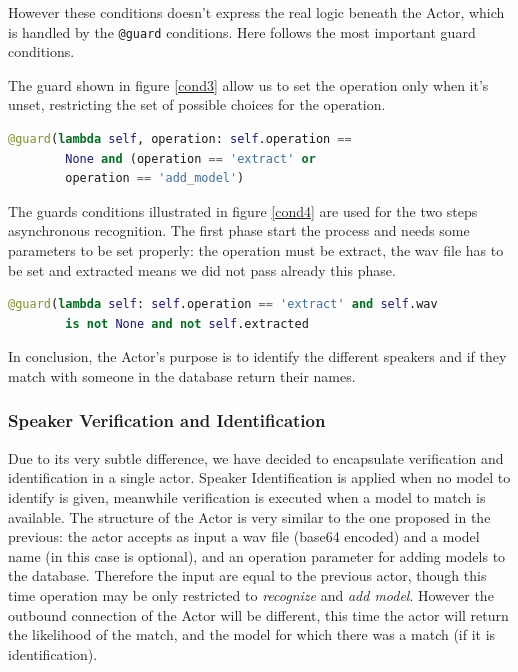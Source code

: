 However these conditions doesn't express the real logic beneath the Actor, which
is handled by the \texttt{@guard} conditions. Here follows the most
important guard conditions.\newline

The guard shown in figure \ref{cond3} allow us to set the operation only when it's unset,
restricting the set of possible choices for the operation.

\begin{lstlisting}[language=Python,frame=single,caption=Sound Actor conditions,label=cond3]
    @guard(lambda self, operation: self.operation ==
        None and (operation == 'extract' or
        operation == 'add_model')
\end{lstlisting}

The guards conditions illustrated in figure \ref{cond4} are used for the two steps
asynchronous recognition. The first phase start the process
and needs some parameters to be set properly:
the operation must be extract, the wav file has to be set
and extracted means we did not pass already this phase.

\begin{lstlisting}[language=Python,frame=single,caption=Sound Actor conditions,label=cond4]
    @guard(lambda self: self.operation == 'extract' and self.wav
        is not None and not self.extracted
\end{lstlisting}


In conclusion, the Actor's purpose is to identify the different
speakers and if they match with someone in the database return
their names.

\subsubsection{Speaker Verification and Identification}

Due to its very subtle difference, we have decided to encapsulate verification
and identification in a single actor. Speaker Identification is applied when no
model to identify is given, meanwhile verification is executed when a model to match
is available. The structure of the Actor is very similar to the one proposed in the
previous: the actor accepts as input a wav file (base64 encoded) and a model name
(in this case is optional), and an operation parameter for adding models to the database.
Therefore the input are equal to the previous actor, though this time operation may
be only restricted to \textit{recognize} and \textit{add model}. However the outbound
connection of the Actor will be different, this time the actor will return the likelihood
of the match, and the model for which there was a match (if it is identification).




